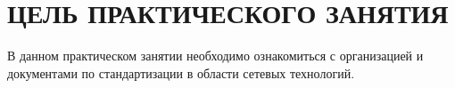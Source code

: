 \section{ЦЕЛЬ ПРАКТИЧЕСКОГО ЗАНЯТИЯ}

В данном практическом занятии необходимо ознакомиться с организацией и
документами по стандартизации в области сетевых технологий.

\newpage
